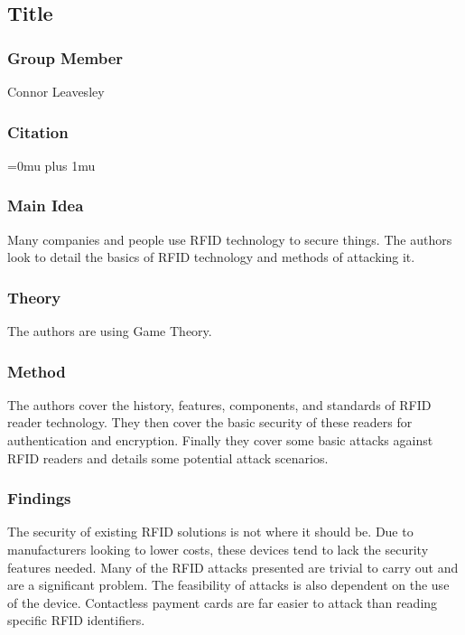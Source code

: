 \noindent
\subsection{Title}

\subsubsection{Group Member}

\noindent
Connor Leavesley

\noindent
\subsubsection{Citation}

\Urlmuskip=0mu plus 1mu\relax

\subsubsection{Main Idea}

\noindent
Many companies and people use RFID technology to secure things. The authors look to detail the basics of RFID technology and methods of attacking it. 

\subsubsection{Theory}

\noindent
The authors are using Game Theory. 

\subsubsection{Method}

\noindent
The authors cover the history, features, components, and standards of RFID reader technology. They then cover the basic security of these readers for authentication and encryption. Finally they cover some basic attacks against RFID readers and details some potential attack scenarios. 

\subsubsection{Findings}

\noindent
The security of existing RFID solutions is not where it should be. Due to manufacturers looking to lower costs, these devices tend to lack the security features needed. Many of the RFID attacks presented are trivial to carry out and are a significant problem. The feasibility of attacks is also dependent on the use of the device. Contactless payment cards are far easier to attack than reading specific RFID identifiers. 


